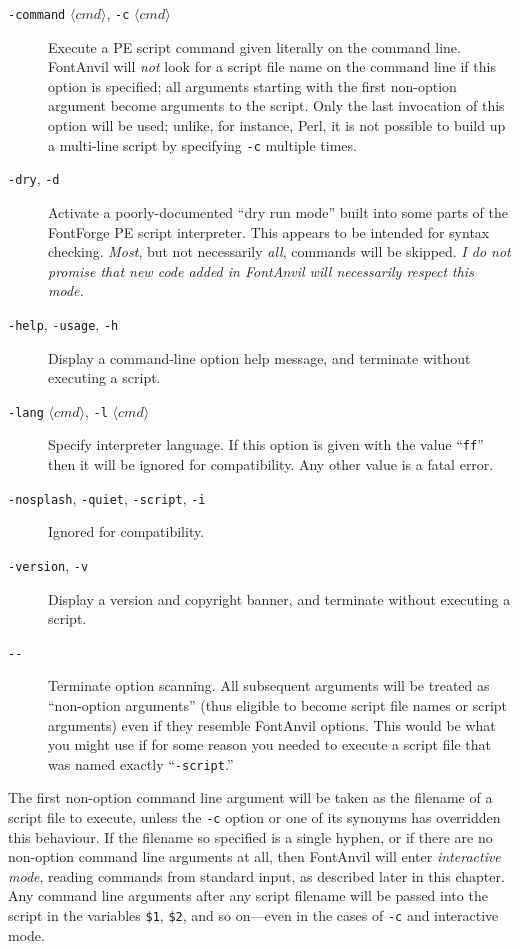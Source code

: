 \documentclass[11pt]{report}
\begin{document}
\begin{description}
  \item[\texttt{-command} $\langle cmd\rangle$,
    \texttt{-c} $\langle cmd\rangle$]
  Execute a PE script command given literally on the command line.  FontAnvil
  will \emph{not} look for a script file name on the command line if this
  option is specified; all arguments starting with the first non-option
  argument become arguments to the script.  Only the last invocation of this
  option will be used; unlike, for instance, Perl, it is not possible to
  build up a multi-line script by specifying \texttt{-c} multiple times.

  \item[\texttt{-dry}, \texttt{-d}]
  Activate a poorly-documented ``dry run mode'' built into some parts of
  the FontForge PE script interpreter.  This appears to
  be intended for syntax checking.  \emph{Most}, but not necessarily
  \emph{all}, commands will be skipped.  \emph{I do not promise that new
  code added in FontAnvil will necessarily respect this mode.}

  \item[\texttt{-help}, \texttt{-usage}, \texttt{-h}]
  Display a command-line option help message, and terminate without
  executing a script.

  \item[\texttt{-lang} $\langle cmd\rangle$,
    \texttt{-l} $\langle cmd\rangle$]
  Specify interpreter language.  If this option is given with the value
  ``\texttt{ff}'' then it will be ignored for compatibility.  Any other
  value is a fatal error.

  \item[\texttt{-nosplash}, \texttt{-quiet}, \texttt{-script}, \texttt{-i}]
  Ignored for compatibility.

  \item[\texttt{-version}, \texttt{-v}]
  Display a version and copyright banner, and terminate without executing a
  script.

  \item[\texttt{-{}-}]
  Terminate option scanning.  All subsequent arguments will be treated as
  ``non-option arguments'' (thus eligible to become script file names or
  script arguments) even if they resemble FontAnvil options.  This would be
  what you might use if for some reason you needed to execute a script file
  that was named exactly ``\texttt{-script}.''
\end{description}

The first non-option command line argument will be taken as the filename of
a script file to execute, unless the \texttt{-c} option or one of its
synonyms has overridden this behaviour.  If the filename so specified is a
single hyphen, or if there are no non-option command line arguments
at all, then FontAnvil will enter \emph{interactive mode}, reading
commands from standard input, as described later in this chapter.  Any
command line arguments after any script filename will be passed
into the script in the variables \texttt{\$1},
\texttt{\$2}, and so on---even in the cases of \texttt{-c} and interactive
mode.
\end{document}
